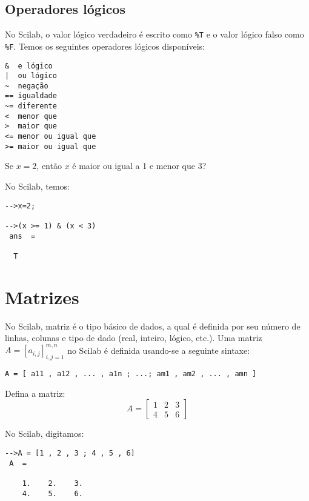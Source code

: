 \documentclass[main.tex]{subfiles}
\begin{document}
\subsection{Operadores lógicos}

No Scilab, o valor lógico verdadeiro é escrito como \verb+%T+ e o valor lógico falso como \verb+%F+. Temos os seguintes operadores lógicos disponíveis:
\begin{verbatim}
&  e lógico
|  ou lógico
~  negação
== igualdade
~= diferente
<  menor que
>  maior que
<= menor ou igual que
>= maior ou igual que
\end{verbatim}

\begin{ex}
  Se $x=2$, então $x$ é maior ou igual a 1 e menor que 3? 
\end{ex}
\begin{sol}
  No Scilab, temos:
\begin{verbatim}
-->x=2;
 
-->(x >= 1) & (x < 3)
 ans  =
 
  T  
\end{verbatim}
\end{sol}

\section{Matrizes}

No Scilab, matriz é o tipo básico de dados, a qual é definida por seu número de linhas, colunas e tipo de dado (real, inteiro, lógico, etc.). Uma matriz $A = [a_{i,j}]_{i,j=1}^{m,n}$ no Scilab é definida usando-se a seguinte sintaxe:
\begin{verbatim}
A = [ a11 , a12 , ... , a1n ; ...; am1 , am2 , ... , amn ]
\end{verbatim}

\begin{ex}
  Defina a matriz:
  \begin{equation*}
    A = \left[
      \begin{array}{ccc}
        1 & 2 & 3\\
        4 & 5 & 6
      \end{array}
\right]
  \end{equation*}
\end{ex}
\begin{sol}
  No Scilab, digitamos:
\begin{verbatim}
-->A = [1 , 2 , 3 ; 4 , 5 , 6]
 A  =
 
    1.    2.    3.  
    4.    5.    6.  
\end{verbatim}
\end{sol}
\end{document}
